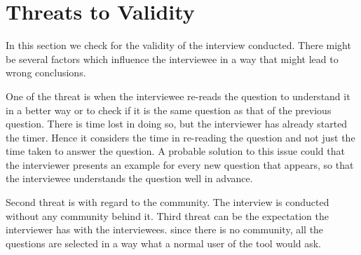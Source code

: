 \section{Threats to Validity}

In this section we check for the validity of the interview conducted. There might be several factors which influence the interviewee in a way that might lead to wrong conclusions.

One of the threat is when the interviewee re-reads the question to understand it in a better way or to check if it is the same question as that of the previous question. There is time lost in doing so, but the interviewer has already started the timer. Hence it considers the time in re-reading the question and not just the time taken to answer the question. A probable solution to this issue could that the interviewer presents an example for every new question that appears, so that the interviewee understands the question well in advance. 

Second threat is with regard to the community. The interview is conducted without any community behind it. 
Third threat can be the expectation the interviewer has with the interviewees. since there is no community, all the questions are selected in a way what a normal user of the tool would ask.